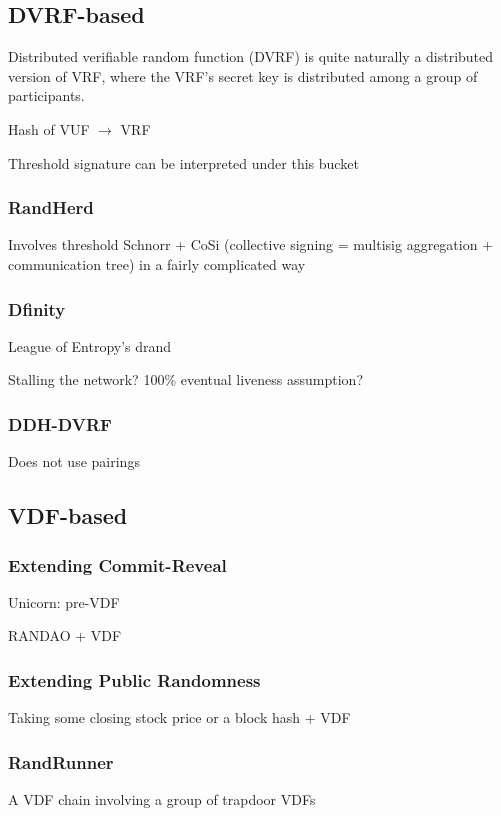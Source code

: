 \documentclass[11pt]{article}
\theoremstyle{definition}
\theoremstyle{remark}
\begin{document}
\subsection{DVRF-based}
Distributed verifiable random function (DVRF) is quite naturally a distributed version of VRF, where the VRF's secret key is distributed among a group of participants.

Hash of VUF $\rightarrow$ VRF

Threshold signature can be interpreted under this bucket

\subsubsection{RandHerd}
Involves threshold Schnorr + CoSi (collective signing = multisig aggregation + communication tree) in a fairly complicated way

\subsubsection{Dfinity}
League of Entropy's drand

Stalling the network? 100\% eventual liveness assumption?
\subsubsection{DDH-DVRF}
Does not use pairings

\subsection{VDF-based}
\subsubsection{Extending Commit-Reveal}
Unicorn: pre-VDF

RANDAO + VDF
\subsubsection{Extending Public Randomness}
Taking some closing stock price or a block hash + VDF
\subsubsection{RandRunner}
A VDF chain involving a group of trapdoor VDFs
\end{document}
